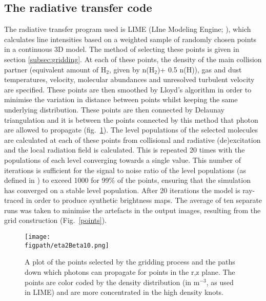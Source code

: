 \documentclass[useAMS,usenatbib,letters]{mn2e}
\newcommand{\figpath}{PFIGS/}
\begin{document}
\subsection{The radiative transfer code} \label{subsec:radiative_transfer_code}
The radiative transfer program used is LIME (LIne Modeling Engine; \citealt{Brinch:2010p13078}), which  calculates line intensities based on a weighted sample of randomly chosen points in a continuous 3D model. The method of selecting these points is given in section \ref{subsec:gridding}. At each of these points, the density of the main collision partner (equivalent amount of H$_2$, given by n(H$_2$)+ 0.5 n(H)), gas and dust temperatures, velocity, molecular abundances and unresolved turbulent velocity are specified. These points are then smoothed by Lloyd's algorithm \citep{Lloyd1982} in order to minimise the variation in distance between points whilst keeping the same underlying distribution. These points are then connected by Delaunay triangulation and it is between the points connected by this method that photon are allowed to propagate (fig.~\ref{grid}). The level populations of the selected molecules are calculated at each of these points from collisional and radiative (de)excitation and the local radiation field is calculated. This is repeated 20 times with the populations of each level converging towards a single value. This number of iterations is sufficient for the signal to noise ratio of the level populations (as defined in \citealt{Brinch:2010p13078}) to exceed 1000 for 99\% of the points, ensuring that the simulation has converged on a stable level population. After 20 iterations the model is ray-traced in order to produce synthetic brightness maps. The average of ten separate runs was taken to minimise the artefacts in the output images, resulting from the grid construction (Fig.~\ref{points}).


\begin{figure}
 \texttt{[image: \\figpath/eta2Beta10.png]}
 \caption{A plot of the points selected by the gridding process and the paths down which photons can propagate for points in the r,z plane. The points are color coded by the density distribution (in m$^{-3}$, as used in LIME) and are more concentrated in the high density knots.}
\label{grid}
\end{figure}
\end{document}

